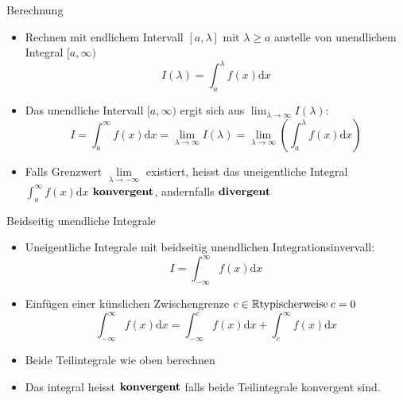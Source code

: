 \begin{KR}{Berechnung}
\begin{itemize}
	\item Rechnen mit endlichem Intervall \([a,\lambda] \text{ mit } \lambda \ge a \) anstelle von unendlichem
		Integral \([a,\infty) \)
		\[I(\lambda)=\int_a^{\lambda}{f(x)\mathrm{d}x} \]
	\item Das unendliche Intervall \([a,\infty) \) ergit sich aus \(\lim_{\lambda \rightarrow
		\infty}I(\lambda) \):
		\[I=\int_a^{\infty}{f(x)\mathrm{d}x}=\underset{\lambda \rightarrow \infty}{\lim}I(\lambda)=
		\underset{\lambda \rightarrow \infty}{\lim}\left(\int_a^{\lambda}{f(x)\mathrm{d}x}\right) \]
    \item Falls Grenzwert \(\underset{\lambda \rightarrow -\infty}{\lim}\) existiert, heisst das uneigentliche
        Integral \(\displaystyle\int_{a}^\infty {f(x)\mathrm{d}x}\) \(\bold{konvergent}\), andernfalls 
        \(\bold{divergent}\)
\end{itemize}
\end{KR}


\begin{KR}{Beidseitig unendliche Integrale}
\begin{itemize}
	\item Uneigentliche Integrale mit beidseitig unendlichen Integrationsinvervall:
		\[I=\int_{-\infty}^{\infty}{f(x)\mathrm{d}x}\]
	\item Einfügen einer künslichen Zwischengrenze \(c \in \mathbb{R}\\\text{typischerweise}\:c=0 \)
		\[\int_{-\infty}^{\infty}{f(x)\mathrm{d}x}=\int_{-\infty}^{c}{f(x)\mathrm{d}x}+\int_c^{\infty}
		{f(x)\mathrm{d}x} \]
	\item Beide Teilintegrale wie oben berechnen
	\item Das integral heisst \(\bold{konvergent}\) falls beide Teilintegrale konvergent sind.
\end{itemize}
\end{KR}


